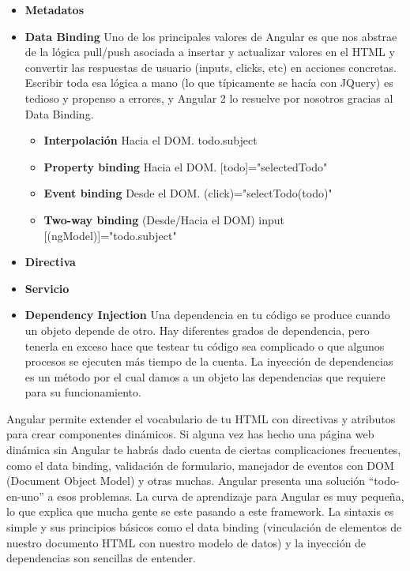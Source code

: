 \begin{itemize}
\item \textbf{Metadatos}
\item \textbf{Data Binding} Uno de los principales valores de Angular es que nos abstrae de la lógica pull/push asociada a insertar y actualizar valores en el HTML y convertir las respuestas de usuario (inputs, clicks, etc) en acciones concretas. Escribir toda esa lógica a mano (lo que típicamente se hacía con JQuery) es tedioso y propenso a errores, y Angular 2 lo resuelve por nosotros gracias al Data Binding.
\begin{itemize}
\item \textbf{Interpolación} Hacia el DOM.
{{todo.subject}}
\item \textbf{Property binding} Hacia el DOM. 
[todo]="selectedTodo"
\item \textbf{Event binding} Desde el DOM. (click)="selectTodo(todo)"

\item \textbf{Two-way binding} (Desde/Hacia el DOM) input [(ngModel)]="todo.subject"
\end{itemize}
\item \textbf{Directiva}
\item \textbf{Servicio}
\item \textbf{Dependency Injection}  Una dependencia en tu código se produce cuando un objeto depende de otro. Hay diferentes grados de dependencia, pero tenerla en exceso hace que testear tu código sea complicado o que algunos procesos se ejecuten más tiempo de la cuenta.
La inyección de dependencias es un método por el cual damos a un objeto las dependencias que requiere para su funcionamiento. 
\end{itemize}

Angular permite extender el vocabulario de tu HTML con directivas y atributos para crear componentes dinámicos. Si alguna vez has hecho una página web dinámica sin Angular te habrás dado cuenta de ciertas complicaciones frecuentes, como el data binding, validación de formulario, manejador de eventos con DOM (Document Object Model) y otras muchas. Angular presenta una solución “todo-en-uno” a esos problemas.
La curva de aprendizaje para Angular es muy pequeña, lo que explica que mucha gente se este pasando a este framework. La sintaxis es simple y sus principios básicos como el data binding (vinculación de elementos de nuestro documento HTML con nuestro modelo de datos) y la inyección de dependencias son sencillas de entender.

\begin{itemize}



\end{itemize}


